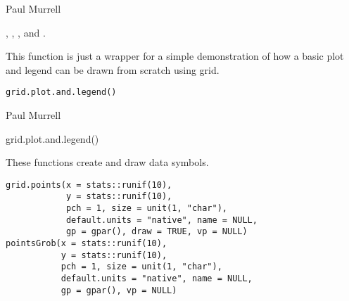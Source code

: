 %
\begin{Author}\relax
 Paul Murrell 
\end{Author}
%
\begin{SeeAlso}\relax
{},
,
, and .
\end{SeeAlso}
%
\begin{Description}\relax
This function is just a wrapper for a simple demonstration of how
a basic plot and legend can be drawn from scratch using grid.
\end{Description}
%
\begin{Usage}
\begin{verbatim}
grid.plot.and.legend()
\end{verbatim}
\end{Usage}
%
\begin{Author}\relax
 Paul Murrell 
\end{Author}
%
\begin{Examples}
\begin{ExampleCode}
grid.plot.and.legend()
\end{ExampleCode}
\end{Examples}
%
\begin{Description}\relax
These functions create and draw data symbols.
\end{Description}
%
\begin{Usage}
\begin{verbatim}
grid.points(x = stats::runif(10),
            y = stats::runif(10),
            pch = 1, size = unit(1, "char"),
            default.units = "native", name = NULL,
            gp = gpar(), draw = TRUE, vp = NULL)
pointsGrob(x = stats::runif(10),
           y = stats::runif(10),
           pch = 1, size = unit(1, "char"),
           default.units = "native", name = NULL,
           gp = gpar(), vp = NULL)
\end{verbatim}
\end{Usage}
%
